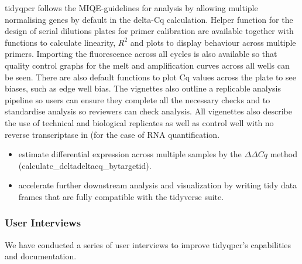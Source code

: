 \documentclass{SBCbookchapter}
\begin{document}
tidyqpcr follows the MIQE-guidelines for analysis by allowing multiple normalising genes by default in the delta-Cq calculation. 
Helper function for the design of serial dilutions plates for primer calibration are available together with functions to calculate linearity, $R^2$ and plots to display behaviour across multiple primers.
Importing the fluorescence across all cycles is also available so that quality control graphs for the melt and amplification curves across all wells can be seen.
There are also default functions to plot Cq values across the plate to see biases, such as edge well bias. 
The vignettes also outline a replicable analysis pipeline so users can ensure they complete all the necessary checks and to standardise analysis so reviewers can check analysis.
All vigenettes also describe the use of technical and biological replicates as well as control well with no reverse transcriptase in (for the case of RNA quantification.

\begin{itemize}
    \item estimate differential expression across multiple samples by the $\Delta \Delta Cq$ method (calculate\_deltadeltacq\_bytargetid).
    \item accelerate further downstream analysis and visualization by writing tidy data frames that are fully compatible with the tidyverse suite.

\end{itemize}

\subsubsection{User Interviews}
We have conducted a series of user interviews to improve tidyqpcr's capabilities and documentation.
\end{document}
